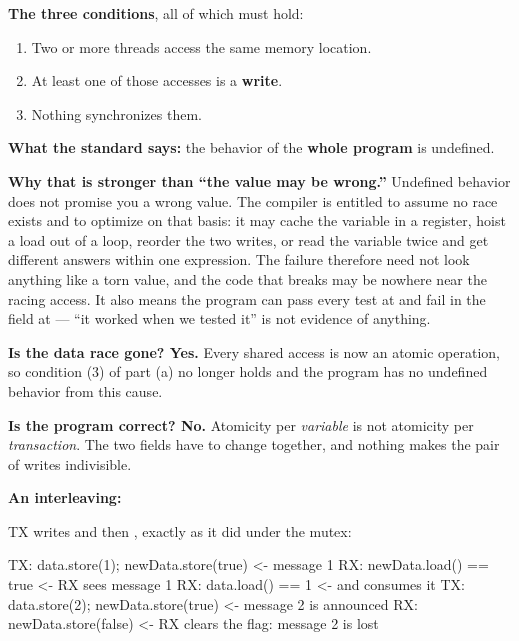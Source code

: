 
\textbf{The three conditions}, all of which must hold: 
\begin{enumerate}
  \item Two or more threads access the same memory location.
  \item At least one of those accesses is a \textbf{write}.
  \item Nothing synchronizes them.
\end{enumerate}

\textbf{What the standard says:} the behavior of the \textbf{whole program} is undefined.

\textbf{Why that is stronger than ``the value may be wrong.''} Undefined behavior does not promise
you a wrong value. The compiler is entitled to assume no race exists and to optimize on that basis:
it may cache the variable in a register, hoist a load out of a loop, reorder the two writes, or read
the variable twice and get different answers within one expression. The failure therefore need not
look anything like a torn value, and the code that breaks may be nowhere near the racing access. It
also means the program can pass every test at  and fail in the field at  ---
``it worked when we tested it'' is not evidence of anything. 

\textbf{Is the data race gone? Yes.} Every shared access is now an atomic operation, so condition
(3) of part (a) no longer holds and the program has no undefined behavior from this cause.

\textbf{Is the program correct? No.} Atomicity per \emph{variable} is not atomicity per
\emph{transaction}. The two fields have to change together, and nothing makes the pair of writes
indivisible. 

\textbf{An interleaving:} 

TX writes  and then , exactly as it did under the mutex:

\begin{console}
TX: data.store(1); newData.store(true)   <- message 1
RX: newData.load() == true               <- RX sees message 1
RX: data.load() == 1                     <- and consumes it
TX: data.store(2); newData.store(true)   <- message 2 is announced
RX: newData.store(false)                 <- RX clears the flag: message 2 is lost
\end{console}

